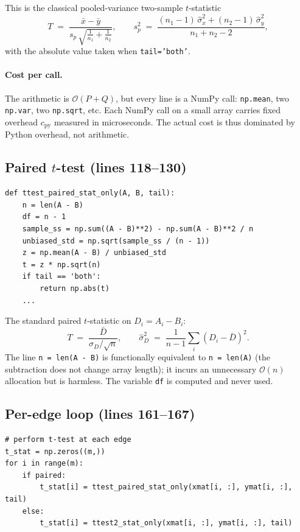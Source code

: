 \documentclass[11pt]{article}
\begin{document}
This is the classical pooled-variance two-sample $t$-statistic
%
\begin{equation}
T \;=\; \frac{\bar x - \bar y}{s_p\,\sqrt{\tfrac{1}{n_1} + \tfrac{1}{n_2}}}, \qquad s_p^2 \;=\; \frac{(n_1-1)\,\hat\sigma_x^2 + (n_2-1)\,\hat\sigma_y^2}{n_1+n_2-2},
\label{eq:tstat}
\end{equation}
%
with the absolute value taken when \texttt{tail='both'}.

\paragraph{Cost per call.} The arithmetic is $\mathcal{O}(P+Q)$, but every line is a NumPy call: \texttt{np.mean}, two \texttt{np.var}, two \texttt{np.sqrt}, etc. Each NumPy call on a small array carries fixed overhead $c_{\textrm{py}}$ measured in microseconds. The actual cost is thus dominated by Python overhead, not arithmetic.

\subsection{Paired $t$-test (lines 118--130)}

\begin{lstlisting}[firstnumber=118]
def ttest_paired_stat_only(A, B, tail):
    n = len(A - B)
    df = n - 1
    sample_ss = np.sum((A - B)**2) - np.sum(A - B)**2 / n
    unbiased_std = np.sqrt(sample_ss / (n - 1))
    z = np.mean(A - B) / unbiased_std
    t = z * np.sqrt(n)
    if tail == 'both':
        return np.abs(t)
    ...
\end{lstlisting}

The standard paired $t$-statistic on $D_i = A_i - B_i$:
%
\begin{equation}
T \;=\; \frac{\bar D}{\hat\sigma_D / \sqrt{n}}, \qquad \hat\sigma_D^2 \;=\; \frac{1}{n-1}\sum_i (D_i - \bar D)^2.
\end{equation}
%
The line \texttt{n = len(A - B)} is functionally equivalent to \texttt{n = len(A)} (the subtraction does not change array length); it incurs an unnecessary $\mathcal{O}(n)$ allocation but is harmless. The variable \texttt{df} is computed and never used.

\subsection{Per-edge loop (lines 161--167)}

\begin{lstlisting}[firstnumber=161]
# perform t-test at each edge
t_stat = np.zeros((m,))
for i in range(m):
    if paired:
        t_stat[i] = ttest_paired_stat_only(xmat[i, :], ymat[i, :], tail)
    else:
        t_stat[i] = ttest2_stat_only(xmat[i, :], ymat[i, :], tail)
\end{lstlisting}
\end{document}
